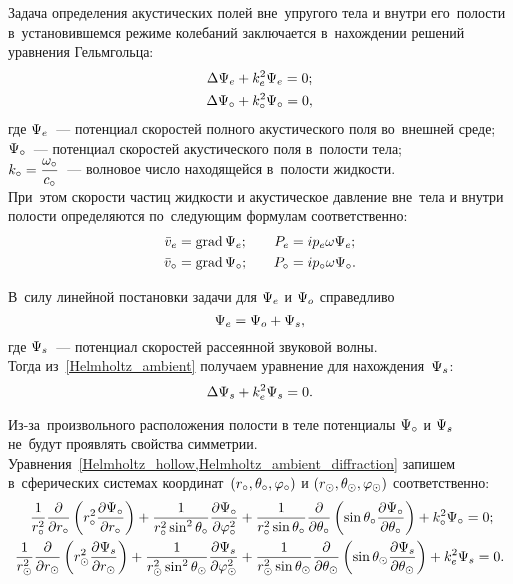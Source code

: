 Задача определения акустических полей вне~упругого тела и внутри его~полости в~установившемся режиме колебаний заключается в~нахождении решений уравнения Гельмгольца:
\begin{align}
\Lap\P\en &+ k\en^2\P\en = 0;\label{Helmholtz_ambient}\\
\Lap\P\c &+ k\c^2\P\c = 0,\label{Helmholtz_hollow}
\end{align}
где $\P\en$~--- потенциал скоростей полного акустического поля во~внешней среде;\\
$\P\c$~--- потенциал скоростей акустического поля в~полости тела;\\
$k\c = \df{\om\c}{c\c}$~--- волновое число находящейся в~полости жидкости.\\ При~этом скорости частиц жидкости и акустическое давление вне~тела и внутри полости определяются по~следующим формулам соответственно:
\begin{align}
\bar{v}\en &= \grad\P\en; &\q P\en &= ip\en\om\P\en;\\
\bar{v}\c &= \grad\P\c; &\q P\c &= ip\c\om\P\c.
\end{align}


В~силу линейной постановки задачи для $\P\en$ и $\P\o$ справедливо
\begin{equation} \label{potention_speed_ambient}
\P\en = \P\o + \P\sc,
\end{equation}
где $\P\sc$~--- потенциал скоростей рассеянной звуковой волны.\\
Тогда из~\eqref{Helmholtz_ambient} получаем уравнение для нахождения~$\P\sc$:
\begin{equation} \label{Helmholtz_ambient_diffraction}
\Lap\P\sc + k\en^2\P\sc = 0.
\end{equation}

Из-за~произвольного расположения полости в теле потенциалы $\P\c$ и $\P\sc$ не~будут проявлять свойства симметрии.
Уравнения~\cref{Helmholtz_hollow,Helmholtz_ambient_diffraction} запишем в~сферических системах координат~$(r\c, \Q\c, \f\c)$ и $(r\s, \Q\s, \f\s)$ соответственно:
\begin{align}
\fr1{r\c^2}\fr\de{\de r\c}\left(r\c^2 \fr{\de\P\c}{\de r\c}\right) + \fr1{r\c^2\sin^2\Q\c}\fr{\de\P\c}{\de\f\c^2} &+ \fr1{r\c^2\sin\Q\c}\fr\de{\de\Q\c} \left(\sin\Q\c \fr{\de\P\c}{\de\Q\c}\right) + k\c^2\P\c = 0;\\
\fr1{r\s^2}\fr\de{\de r\s}\left(r\s^2 \fr{\de\P\sc}{\de r\s}\right) + \fr1{r\s^2\sin^2\Q\s}\fr{\de\P\sc}{\de\f\s^2} &+ \fr1{r\s^2\sin\Q\s}\fr\de{\de\Q\s} \left(\sin\Q\s \fr{\de\P\sc}{\de\Q\s}\right) + k\en^2\P\sc = 0.
\end{align}

